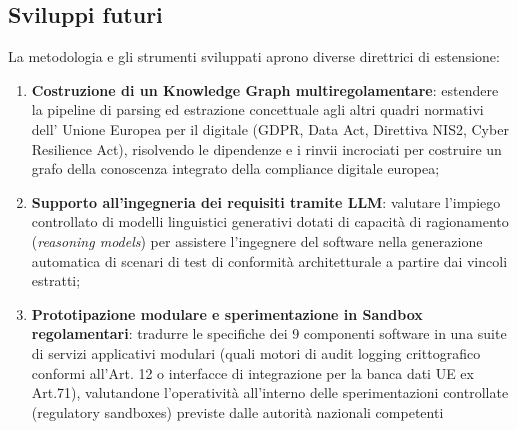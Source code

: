 \documentclass[12pt,a4paper,oneside]{report}
\begin{document}
\subsection{Sviluppi futuri}
La metodologia e gli strumenti sviluppati aprono diverse direttrici di estensione:
\begin{enumerate}
    \item \textbf{Costruzione di un Knowledge Graph multiregolamentare}: estendere la pipeline di parsing ed estrazione concettuale agli altri quadri normativi dell' Unione Europea per il digitale (GDPR, Data Act, Direttiva NIS2, Cyber Resilience Act), risolvendo le dipendenze e i rinvii incrociati per costruire un grafo della conoscenza integrato della compliance digitale europea;
    \item \textbf{Supporto all'ingegneria dei requisiti tramite LLM}: valutare l'impiego controllato di modelli linguistici generativi dotati di capacità di ragionamento (\textit{reasoning models}) per assistere l'ingegnere del software nella generazione automatica di scenari di test di conformità architetturale a partire dai vincoli estratti;
    \item \textbf{Prototipazione modulare e sperimentazione in Sandbox regolamentari}: tradurre le specifiche dei 9 componenti software in una suite di servizi applicativi modulari (quali motori di audit logging crittografico conformi all'Art. 12 o interfacce di integrazione per la banca dati UE ex Art.71), valutandone l'operatività all'interno delle sperimentazioni controllate (regulatory sandboxes) previste dalle autorità nazionali competenti
\end{enumerate}


\clearpage
\printbibliography[heading=bibintoc, title={Bibliografia}]
\end{document}
